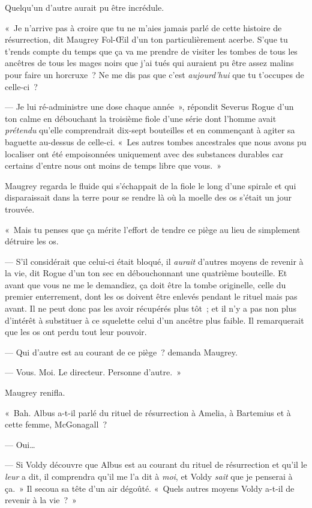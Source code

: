 Quelqu'un d'autre aurait pu être incrédule.

«~Je n'arrive pas à croire que tu ne m'aies jamais parlé de cette histoire de résurrection, dit Maugrey Fol-Œil d'un ton particulièrement acerbe.
S'que tu t'rends compte du temps que ça va me prendre de visiter les tombes de tous les ancêtres de tous les mages noirs que j'ai tués qui auraient pu être assez malins pour faire un horcruxe~?
Ne me dis pas que c'est \emph{aujourd'hui} que tu t'occupes de celle-ci~?

--- Je lui ré-administre une dose chaque année~», répondit Severus Rogue d'un ton calme en débouchant la troisième fiole d'une série dont l'homme avait \emph{prétendu} qu'elle comprendrait dix-sept bouteilles et en commençant à agiter sa baguette au-dessus de celle-ci.
«~Les autres tombes ancestrales que nous avons pu localiser ont été empoisonnées uniquement avec des substances durables car certains d'entre nous ont moins de temps libre que vous.~»

Maugrey regarda le fluide qui s'échappait de la fiole le long d'une spirale et qui disparaissait dans la terre pour se rendre là où la moelle des os s'était un jour trouvée.

«~Mais tu penses que ça mérite l'effort de tendre ce piège au lieu de simplement détruire les os.

--- S'il considérait que celui-ci était bloqué, il \emph{aurait} d'autres moyens de revenir à la vie, dit Rogue d'un ton sec en débouchonnant une quatrième bouteille.
Et avant que vous ne me le demandiez, ça doit être la tombe originelle, celle du premier enterrement, dont les os doivent être enlevés pendant le rituel mais pas avant.
Il ne peut donc pas les avoir récupérés plus tôt~; et il n'y a pas non plus d'intérêt à substituer à ce squelette celui d'un ancêtre plus faible.
Il remarquerait que les os ont perdu tout leur pouvoir.

--- Qui d'autre est au courant de ce piège~? demanda Maugrey.

--- Vous.
Moi. Le directeur.
Personne d'autre.~»

Maugrey renifla.

«~Bah. Albus a-t-il parlé du rituel de résurrection à Amelia, à Bartemius et à cette femme, McGonagall~?

--- Oui…

--- Si Voldy découvre que Albus est au courant du rituel de résurrection et qu'il le \emph{leur} a dit, il comprendra qu'il me l'a dit à \emph{moi}, et Voldy \emph{sait} que je penserai à ça.~»
Il secoua sa tête d'un air dégoûté.
«~Quels autres moyens Voldy a-t-il de revenir à la vie~?~»

